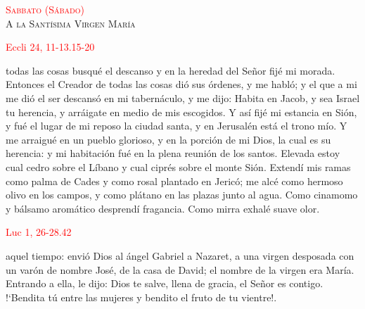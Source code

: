 \documentclass[10pt]{article}
\begin{document}
\begin{multicols}{2}
      \begin{center}
            \noindent\textsc{\textcolor{red}{Sabbato (Sábado)}\\ {\large A la Santísima Virgen María}}
      \end{center}

      \hfill\textcolor{red}{Eccli 24, 11-13.15-20}

      todas las cosas busqué el descanso y en la heredad del Señor fijé mi morada. Entonces el Creador de todas las cosas dió sus órdenes, y me habló; y el que a mi me dió el ser
      descansó en mi tabernáculo, y me dijo: Habita en Jacob, y sea Israel tu herencia, y arráigate en medio de mis escogidos. Y así fijé mi estancia en Sión, y fué el lugar de mi reposo
      la ciudad santa, y en Jerusalén está el trono mío. Y me arraigué en un pueblo glorioso, y en la porción de mi Dios, la cual es su herencia: y mi habitación fué en la plena reunión
      de los santos. Elevada estoy cual cedro sobre el Líbano y cual ciprés sobre el monte Sión. Extendí mis ramas como palma de Cades y como rosal plantado en Jericó; me alcé como hermoso
      olivo en los campos, y como plátano en las plazas junto al agua. Como cinamomo y bálsamo aromático desprendí fragancia. Como mirra exhalé suave olor.

      \vspace{2mm}

      \hfill\textcolor{red}{Luc 1, 26-28.42}

      aquel tiempo: envió Dios al ángel Gabriel a Nazaret, a una virgen desposada con un varón de nombre José, de la casa de David; el nombre de la virgen era María. 
      Entrando a ella, le dijo: Dios te salve, llena de gracia, el Señor es contigo. {!`}Bendita tú entre las mujeres y bendito el fruto de tu vientre!.

      \vspace{2mm}

      \begin{otherlanguage}{latin}
            

            \vspace{1mm}

            

            \vspace{1mm}

            


\end{otherlanguage}
\end{multicols}
\end{document}
